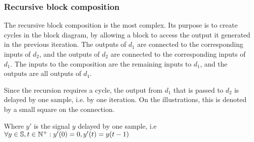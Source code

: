 \subsubsection{Recursive block composition}
The recursive block composition is the most complex. Its purpose is to create cycles in the block diagram, by
allowing a block to access the output it generated in the previous iteration. The outputs of
$d_1$ are connected to the corresponding inputs of $d_2$, and the outputs
of $d_2$ are connected to the corresponding inputs of $d_1$. The inputs to
the composition are the remaining inputs to $d_1$, and the outputs are all outputs of
$d_1$.

Since the recursion requires a cycle, the output from $d_1$ that is passed to
$d_2$ is delayed by one sample, i.e. by one iteration. On the illustrations, this is denoted
by a small square on the connection.

\begin{minipage}{0.5\linewidth}
  \begin{prooftree}
  \end{prooftree}
  \begin{prooftree}
  \end{prooftree}
  Where $y'$ is the signal $y$ delayed by one sample, i.e \\
  $\forall y \in \Sig, t \in \mathbb{N}^+ : y'(0) = 0, y'(t) = y(t - 1)$
\end{minipage}
\begin{minipage}{0.5\linewidth}
  \begin{figure}[H]
    \centering
    \label{fig:block_rec}
    
  \end{figure}
\end{minipage}

